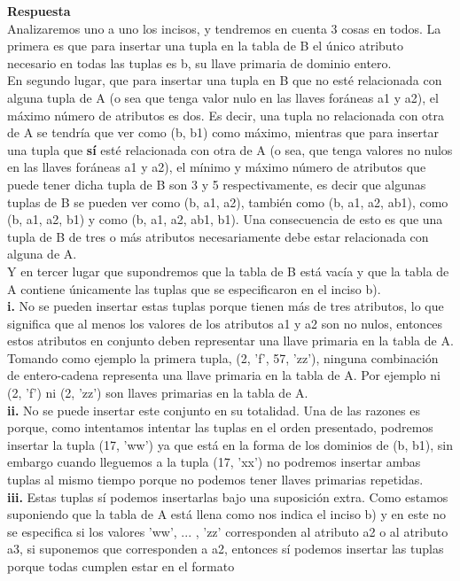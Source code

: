 \documentclass[12pt,a4paper]{article}
\begin{document}
\begin{enumerate}
\begin{enumerate}
				\textbf{Respuesta}\\
				Analizaremos uno a uno los incisos, y tendremos en cuenta 3 cosas en todos. La primera es que para insertar una tupla en la tabla de B el único atributo necesario en todas las tuplas es b, su llave primaria de dominio entero. \\
				En segundo lugar, que para insertar una tupla en B que no esté relacionada con alguna tupla de A (o sea que tenga valor nulo en las llaves foráneas a1 y a2), el máximo número de atributos es dos. Es decir, una tupla no relacionada con otra de A se tendría que ver como (b, b1) como máximo, mientras que para insertar una tupla que \textbf{sí} esté relacionada con otra de A (o sea, que tenga valores no nulos en las llaves foráneas a1 y a2), el mínimo y máximo número de atributos que puede tener dicha tupla de B son 3 y 5 respectivamente, es decir que algunas tuplas de B se pueden ver como (b, a1, a2), también como (b, a1, a2, ab1), como (b, a1, a2, b1) y como (b, a1, a2, ab1, b1). Una consecuencia de esto es que una tupla de B de tres o más atributos necesariamente debe estar relacionada con alguna de A.\\
				Y en tercer lugar que supondremos que la tabla de B está vacía y que la tabla de A contiene únicamente las tuplas que se especificaron en el inciso b).\\
				\textbf{i.} No se pueden insertar estas tuplas porque tienen más de tres atributos, lo que significa que al menos los valores de los atributos a1 y a2 son no nulos, entonces estos atributos en conjunto deben representar una llave primaria en la tabla de A. Tomando como ejemplo la primera tupla, (2, 'f', 57, 'zz'), ninguna combinación de entero-cadena representa una llave primaria en la tabla de A. Por ejemplo ni (2, 'f') ni (2, 'zz') son llaves primarias en la tabla de A.\\
				\textbf{ii.} No se puede insertar este conjunto en su totalidad. Una de las razones es porque, como intentamos intentar las tuplas en el orden presentado, podremos insertar la tupla (17, 'ww') ya que está en la forma de los dominios de (b, b1), sin embargo cuando lleguemos a la tupla (17, 'xx') no podremos insertar ambas tuplas al mismo tiempo porque no podemos tener llaves primarias repetidas.\\
				\textbf{iii.} Estas tuplas sí podemos insertarlas bajo una suposición extra. Como estamos suponiendo que la tabla de A está llena como nos indica el inciso b) y en este no se especifica si los valores 'ww', ... , 'zz' corresponden al atributo a2 o al atributo a3, si suponemos que corresponden a a2, entonces sí podemos insertar las tuplas porque todas cumplen estar en el formato\\

\end{enumerate}
\end{enumerate}
\end{document}
